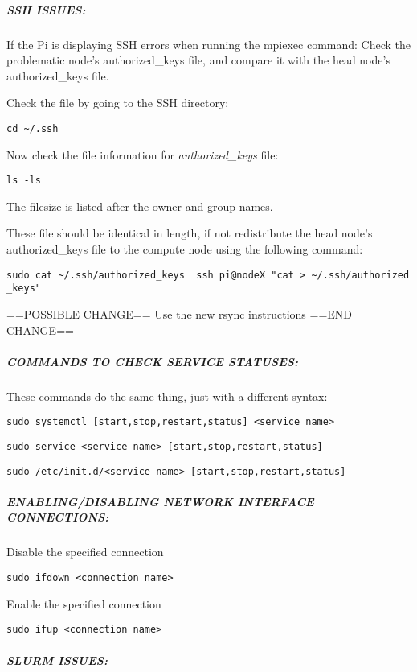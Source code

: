 \documentclass[]{article}
\let\oldsubparagraph\subparagraph
\renewcommand{\subparagraph}[1]{\oldsubparagraph{#1}\mbox{}}
\begin{document}
\subparagraph{SSH ISSUES:}\label{ssh-issues}

If the Pi is displaying SSH errors when running the mpiexec command:
Check the problematic node's authorized\_keys file, and compare it with
the head node's authorized\_keys file.

Check the file by going to the SSH directory:

\begin{verbatim}
cd ~/.ssh
\end{verbatim}

Now check the file information for \emph{authorized\_keys} file:

\begin{verbatim}
ls -ls
\end{verbatim}

The filesize is listed after the owner and group names.

These file should be identical in length, if not redistribute the head
node's authorized\_keys file to the compute node using the following
command:

\texttt{sudo\ cat\ \textasciitilde{}/.ssh/authorized\_keys\ \textbar{}\ ssh\ pi@nodeX\ "cat\ \textgreater{}\ \textasciitilde{}/.ssh/authorized\_keys"}

==POSSIBLE CHANGE== Use the new rsync instructions ==END CHANGE==

\subparagraph{COMMANDS TO CHECK SERVICE
STATUSES:}\label{commands-to-check-service-statuses}

These commands do the same thing, just with a different syntax:

\texttt{sudo\ systemctl\ {[}start,stop,restart,status{]}\ \textless{}service\ name\textgreater{}}

\texttt{sudo\ service\ \textless{}service\ name\textgreater{}\ {[}start,stop,restart,status{]}}

\texttt{sudo\ /etc/init.d/\textless{}service\ name\textgreater{}\ {[}start,stop,restart,status{]}}

\subparagraph{ENABLING/DISABLING NETWORK INTERFACE
CONNECTIONS:}\label{enablingdisabling-network-interface-connections}

Disable the specified connection

\texttt{sudo\ ifdown\ \textless{}connection\ name\textgreater{}}

Enable the specified connection

\texttt{sudo\ ifup\ \textless{}connection\ name\textgreater{}}

\subparagraph{SLURM ISSUES:}\label{slurm-issues}
\end{document}
